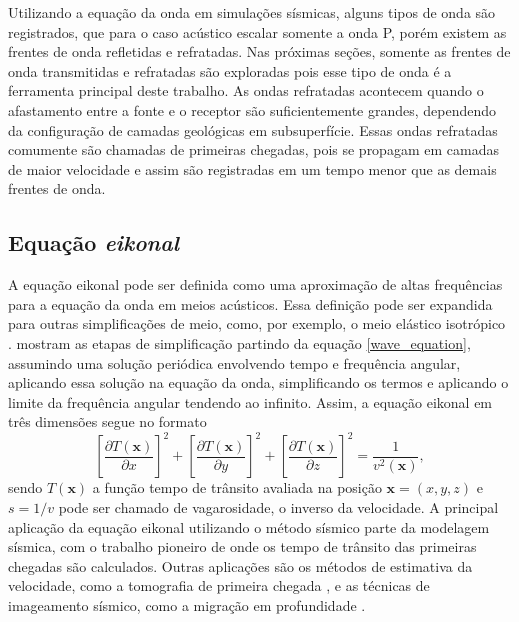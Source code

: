 Utilizando a equação da onda em simulações sísmicas, alguns tipos de onda são registrados, que para o caso acústico escalar somente a onda P, porém existem as frentes de onda refletidas e refratadas. Nas próximas seções, somente as frentes de onda transmitidas e refratadas são exploradas pois esse tipo de onda é a ferramenta principal deste trabalho. As ondas refratadas acontecem quando o afastamento entre a fonte e o receptor são suficientemente grandes, dependendo da configuração de camadas geológicas em subsuperfície. Essas ondas refratadas comumente são chamadas de primeiras chegadas, pois se propagam em camadas de maior velocidade e assim são registradas em um tempo menor que as demais frentes de onda.          

\subsection{Equação \textit{eikonal}}

A equação eikonal pode ser definida como uma aproximação de altas frequências para a equação da onda em meios acústicos. Essa definição pode ser expandida para outras simplificações de meio, como, por exemplo, o meio elástico isotrópico \cite{cerveny2003seismic}.  mostram as etapas de simplificação partindo da equação \ref{wave_equation}, assumindo uma solução periódica envolvendo tempo e frequência angular, aplicando essa solução na equação da onda, simplificando os termos e aplicando o limite da frequência angular tendendo ao infinito. Assim, a equação eikonal em três dimensões segue no formato 
\begin{equation}
	\left[\dfrac{\partial T(\mathbf{x})}{\partial x}\right]^2 + \left[\dfrac{\partial T(\mathbf{x})}{\partial y}\right]^2 + \left[\dfrac{\partial T(\mathbf{x})}{\partial z}\right]^2 = \dfrac{1}{v^2(\mathbf{x})}, 	
	\label{eikonal_full}
\end{equation} 
\noindent sendo $T(\mathbf{x})$ a função tempo de trânsito avaliada na posição $\mathbf{x} = (x,y,z)$ e $s = 1/v$ pode ser chamado de vagarosidade, o inverso da velocidade. A principal aplicação da equação eikonal utilizando o método sísmico parte da modelagem sísmica, com o trabalho pioneiro de  onde os tempo de trânsito das primeiras chegadas são calculados. Outras aplicações são os métodos de estimativa da velocidade, como a tomografia de primeira chegada \cite{zhang1998nonlinear, sei1994gradient, tromp2005seismic, taillandier2009first},  e as técnicas de imageamento sísmico, como a migração em profundidade   \cite{gray1994kirchhoff, zhang2006refraction}.  
 
